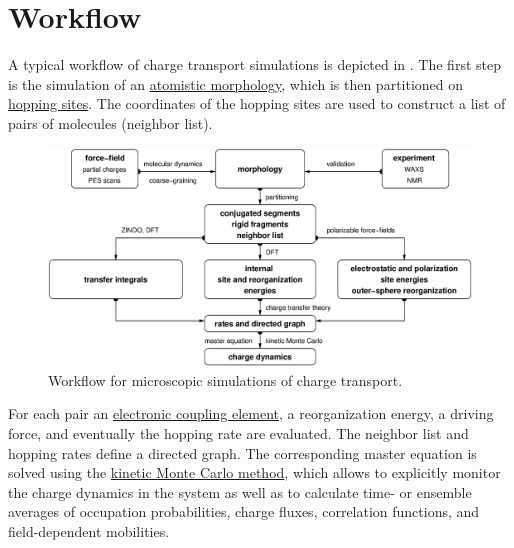 \section{Workflow}
A typical workflow of charge transport simulations is depicted in . The first step is the simulation of an \hyperref[sec:morphology]{atomistic morphology}, which is then partitioned on \hyperref[sec:mapping]{hopping sites}. The coordinates of the hopping sites are used to construct a list of pairs of molecules (neighbor list). 

\begin{figure}[h]
\includegraphics[width=\textwidth]{fig/workflow/workflow}
 \caption{%
   Workflow for microscopic simulations of charge transport.  %
   \label{fig:workflow}}
\end{figure}

For each pair an \hyperref[sec:transfer_integrals]{electronic coupling element}, a reorganization energy, a driving force, and eventually the hopping rate are evaluated. The neighbor list and hopping rates define a directed graph. The corresponding master equation is solved using the  \hyperref[sec:kmc]{kinetic Monte Carlo method}, which allows to explicitly monitor the charge dynamics in the system as well as to calculate time- or ensemble averages of occupation probabilities, charge fluxes, correlation functions, and field-dependent mobilities.
